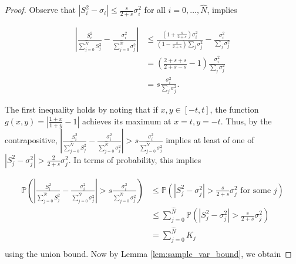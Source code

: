 \documentclass[pdflatex,sn-mathphys-num]{sn-jnl}%
\theoremstyle{thmstyleone}%
\theoremstyle{thmstyletwo}%
\theoremstyle{thmstylethree}%
\begin{document}
\begin{proof}
	Observe that $|S^2_i - \sigma_i|\leq \frac{s}{2+s}\sigma^2_i$ for all $i = 0,\dots, \hat{N}$, implies
	
	\begin{align*}
		\left|\frac{S_i^2}{\sum_{j=0}^{\hat{N}}S_j^2} - \frac{\sigma_i^2}{\sum_{j=0}^{\hat{N}}\sigma_j^2}\right| &\leq \frac{(1+\frac{s}{2+s})\sigma_i^2}{(1-\frac{s}{2+s})\sum_j \sigma^2_j} - \frac{\sigma^2_i}{\sum_j \sigma^2_j}\\
		&= (\frac{2+s+s}{2+s-s}-1) \frac{\sigma^2_i}{\sum_j\sigma^2_j}\\
		&= s\frac{\sigma^2_i}{\sum_j\sigma^2_j}.
	\end{align*}
	
	The first inequality holds by noting that if $x,y \in [-t,t]$, the function $g(x,y) = \left|\frac{1+x}{1+y} - 1\right|$  achieves its maximum at $x = t, y = -t$. Thus, by the contrapositive,  $\left|\frac{S_i^2}{\sum_{j=0}^{\hat{N}}S_j^2} - \frac{\sigma_i^2}{\sum_{j=0}^{\hat{N}}\sigma_j^2}\right| > s\frac{\sigma_i^2}{\sum_{j=0}^{\hat{N}}\sigma_j^2}$ implies at least of one of $|S^2_j - \sigma_j^2| > \frac{2}{2+s}\sigma_j^2$. In terms of probability, this implies
	
	\begin{align*}
		\mathbb{P}\left(\left|\frac{S_i^2}{\sum_{j=0}^{\hat{N}}S_j^2} - \frac{\sigma_i^2}{\sum_{j=0}^{\hat{N}}\sigma_j^2}\right|>s\frac{\sigma_i^2}{\sum_{j=0}^{\hat{N}}\sigma_j^2}\right)&\leq \mathbb{P}\left(|S^2_j - \sigma^2_j|> \frac{s}{2+s}\sigma^2_j\text{ for some } j\right) \\
		&\leq \sum_{j=0}^{\hat{N}} \mathbb{P}\left(|S^2_j - \sigma^2_j|> \frac{s}{2+s}\sigma^2_j\right)\\
		& = \sum_{j=0}^{\hat{N}} K_j\\
	\end{align*}
	using the union bound. Now by Lemma \ref{lem:sample_var_bound}, we obtain
	

\end{proof}
\end{document}
